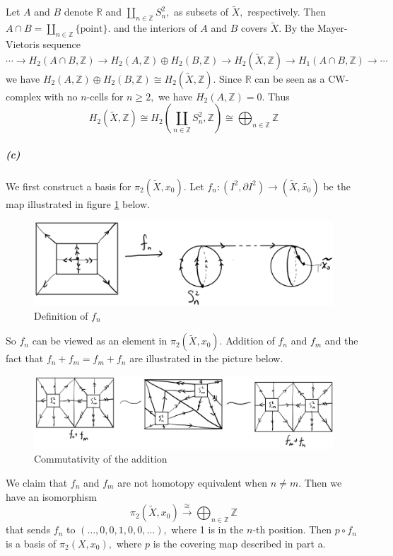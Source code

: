 \documentclass{article}
\begin{document}
Let $A$ and $B$ denote $\mathbb{R}$ and $\coprod_{n\in\mathbb{Z}}S_n^2,$ as subsets of $\widetilde{X},$ respectively. Then $A\cap B=\coprod_{n\in\mathbb{Z}}\{\text{point}\}.$ and the interiors of $A$ and $B$ covers $\widetilde{X}.$ By the Mayer-Vietoris sequence
\[\cdots\rightarrow H_2(A\cap B,\mathbb{Z})\rightarrow H_2(A,\mathbb{Z})\oplus H_2(B,\mathbb{Z})\rightarrow H_2(\widetilde{X},\mathbb{Z})\rightarrow H_1(A\cap B,\mathbb{Z})\rightarrow\cdots\]
we have $H_2(A,\mathbb{Z})\oplus H_2(B,\mathbb{Z})\cong H_2(\widetilde{X},\mathbb{Z}).$ Since $\mathbb{R}$ can be seen as a CW-complex with no $n$-cells for $n\geq2,$ we have $H_2(A,\mathbb{Z})=0.$ Thus
\[H_2(\widetilde{X},\mathbb{Z})\cong H_2\left(\coprod_{n\in\mathbb{Z}}S_n^2,\mathbb{Z}\right)\cong\bigoplus_{n\in\mathbb{Z}}\mathbb{Z}\]


\subparagraph{(c)}We first construct a basis for $\pi_2(\widetilde{X},x_0).$ Let $f_n\colon (I^2,\partial I^2)\rightarrow (\widetilde{X}, \tilde{x_0})$ be the map illustrated in figure \ref{2.1_1} below.
\begin{figure}[ht]
  \centering
  \includegraphics[width=13cm]{2.1_1.png}
  \caption{Definition of $f_n$}\label{2.1_1}
\end{figure}
So $f_n$ can be viewed as an element in $\pi_2(\widetilde{X},x_0).$ Addition of $f_n$ and $f_m$ and the fact that $f_n+f_m=f_m+f_n$ are illustrated in the picture below.
\begin{figure}[ht]
  \centering
  \includegraphics[width=13cm]{2.1_2.png}
  \caption{Commutativity of the addition}\label{2.1_2}
\end{figure}
We claim that $f_n$ and $f_m$ are not homotopy equivalent when $n\neq m$. Then we have an isomorphism
\[\pi_2(\widetilde{X},x_0)\xrightarrow{\cong} \bigoplus_{n\in\mathbb{Z}}\mathbb{Z}\]
that sends $f_n$ to $(\ldots,0,0,1,0,0,\ldots),$ where 1 is in the $n$-th position. Then $p\circ f_n$ is a basis of $\pi_2(X,x_0),$ where $p$ is the covering map described in part a.
\end{document}
